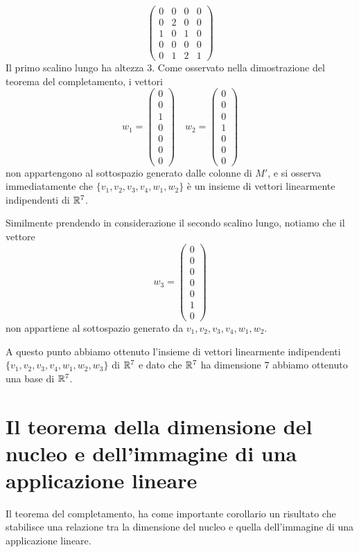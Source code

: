 \begin{example}
\[\begin{pmatrix}
			0 & 0 & 0 & 0 \\
			0 & 2 & 0 & 0 \\
			1 & 0 & 1 & 0 \\
			0 & 0 & 0 & 0 \\
			0 & 1 & 2 & 1
		\end{pmatrix}
	\]
	Il primo scalino lungo ha altezza 3. Come osservato nella dimostrazione
	del teorema del completamento, i vettori
	\[
		w_1 = \begin{pmatrix}
			0 \\ 0 \\ 1 \\ 0 \\ 0 \\ 0 \\ 0
		\end{pmatrix} \quad
		w_2 = \begin{pmatrix}
			0 \\ 0 \\ 0 \\ 1 \\ 0 \\ 0 \\ 0
		\end{pmatrix}
	\]
	non appartengono al sottospazio generato dalle colonne di $M'$, e si
	osserva immediatamente che $\{v_1, v_2, v_3, v_4, w_1, w_2\}$ è un
	insieme di vettori linearmente indipendenti di $\mathbb{R}^7$.

	Similmente prendendo in considerazione il secondo scalino lungo, notiamo
	che il vettore
	\[
		w_3 = \begin{pmatrix}
			0 \\ 0 \\ 0 \\ 0 \\ 0 \\ 1 \\ 0
		\end{pmatrix}
	\]
	non appartiene al sottospazio generato da $v_1, v_2, v_3, v_4, w_1, w_2$.

	A questo punto abbiamo ottenuto l'insieme di vettori linearmente indipendenti
	$\{v_1, v_2, v_3, v_4, w_1, w_2, w_3\}$ di $\mathbb{R}^7$ e dato che
	$\mathbb{R}^7$ ha dimensione 7 abbiamo ottenuto una base di $\mathbb{R}^7$.
\end{example}


\section{Il teorema della dimensione del nucleo e dell'immagine di una applicazione lineare}
Il teorema del completamento, ha come importante corollario un risultato che stabilisce
una relazione tra la dimensione del nucleo e quella dell'immagine di una applicazione
lineare.

